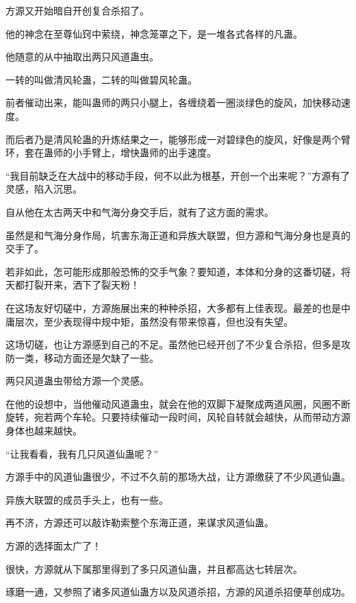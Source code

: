 
\begin{this_body}

方源又开始暗自开创复合杀招了。

他的神念在至尊仙窍中萦绕，神念笼罩之下，是一堆各式各样的凡蛊。

他随意的从中抽取出两只风道蛊虫。

一转的叫做清风轮蛊，二转的叫做碧风轮蛊。

前者催动出来，能叫蛊师的两只小腿上，各缠绕着一圈淡绿色的旋风，加快移动速度。

而后者乃是清风轮蛊的升炼结果之一，能够形成一对碧绿色的旋风，好像是两个臂环，套在蛊师的小手臂上，增快蛊师的出手速度。

“我目前缺乏在大战中的移动手段，何不以此为根基，开创一个出来呢？”方源有了灵感，陷入沉思。

自从他在太古两天中和气海分身交手后，就有了这方面的需求。

虽然是和气海分身作局，坑害东海正道和异族大联盟，但方源和气海分身也是真的交手了。

若非如此，怎可能形成那般恐怖的交手气象？要知道，本体和分身的这番切磋，将天都打裂开来，洒下了裂天粉！

在这场友好切磋中，方源施展出来的种种杀招，大多都有上佳表现。最差的也是中庸层次，至少表现得中规中矩，虽然没有带来惊喜，但也没有失望。

这场切磋，也让方源感到自己的不足。虽然他已经开创了不少复合杀招，但多是攻防一类，移动方面还是欠缺了一些。

两只风道蛊虫带给方源一个灵感。

在他的设想中，当他催动风道蛊虫，就会在他的双脚下凝聚成两道风圈，风圈不断旋转，宛若两个车轮。只要持续催动一段时间，风轮自转就会越快，从而带动方源身体也越来越快。

“让我看看，我有几只风道仙蛊呢？”

方源手中的风道仙蛊很少，不过不久前的那场大战，让方源缴获了不少风道仙蛊。

异族大联盟的成员手头上，也有一些。

再不济，方源还可以敲诈勒索整个东海正道，来谋求风道仙蛊。

方源的选择面太广了！

很快，方源就从下属那里得到了多只风道仙蛊，并且都高达七转层次。

琢磨一通，又参照了诸多风道仙蛊方以及风道杀招，方源的风道杀招便草创成功。


\end{this_body}
